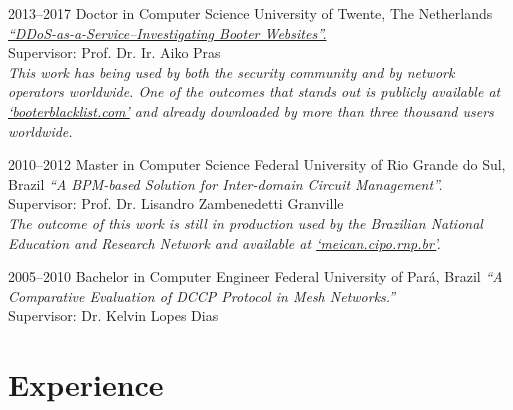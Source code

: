 \documentclass[print]{styles/friggeri-cv-linux} %
\begin{document}
\begin{entrylist}

\entry
{2013--2017}
{Doctor {\normalfont in Computer Science}}
{University of Twente, The Netherlands}
{\emph{\href{https://research.utwente.nl/files/18494043/jjsantanna_thesis.pdf}{``DDoS-as-a-Service--Investigating Booter Websites''.}} \\
Supervisor: Prof. Dr. Ir. Aiko Pras\\	
\textit{This work has being used by both the security community and by
network operators worldwide. One of the outcomes that stands out is publicly available at \href{http://booterblacklist.com}{`booterblacklist.com'} and  already downloaded by more than three thousand users worldwide.}}

\entry
{2010--2012}
{Master {\normalfont in Computer Science}}
{Federal University of Rio Grande do Sul, Brazil}
{\emph{``A BPM-based Solution for Inter-domain Circuit Management''.}\\
Supervisor: Prof. Dr. Lisandro Zambenedetti Granville\\
\textit{The outcome of this work is still in production used by the Brazilian
National Education and Research Network and available at
\href{http://meican.cipo.rnp.br/}{`meican.cipo.rnp.br'}.}}

\entry
{2005--2010}
{Bachelor {\normalfont in Computer Engineer}}
{Federal University of Par\'a, Brazil}
{\emph{``A Comparative Evaluation of DCCP Protocol in Mesh Networks.''} \\ 
Supervisor: Dr. Kelvin Lopes Dias
}

\end{entrylist}

\section{Experience}\vspace{-5pt}
\end{document}
